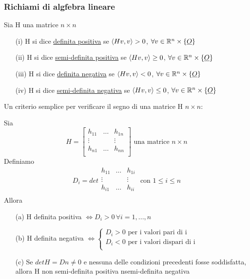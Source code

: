 \subsubsection{Richiami di algfebra lineare}
\begin{definition}
  Sia H una matrice $n\times n$
  \begin{enumerate}
    \item[(i)] H si dice \underline{definita positiva} se $\left\langle Hv,v \right\rangle > 0$, $\forall v \in \mathbb{R}^n \times \{\underline{O}\}$
    \item[(ii)] H si dice \underline{semi-definita positiva} se $\left\langle Hv,v \right\rangle \geq 0$, $\forall v \in \mathbb{R}^n \times \{\underline{O}\}$
    \item[(iii)] H si dice \underline{definita negativa} se $\left\langle Hv,v \right\rangle < 0$, $\forall v \in \mathbb{R}^n \times \{\underline{O}\}$
    \item[(iv)] H si dice \underline{semi-definita negativa} se $\left\langle Hv,v \right\rangle  \leq 0$, $\forall v \in \mathbb{R}^n \times \{\underline{O}\}$
  \end{enumerate}
\end{definition}
Un criterio semplice per verificare il segno di una matrice H $n\times n$:
\begin{theorem}
  Sia $$H = \begin{bmatrix}
    h_{11} & \dots & h_{1n} \\
    \vdots & & \vdots \\
    h_{n1} & \dots & h_{nn} \\
  \end{bmatrix} \text{ una matrice } n \times n$$
  Definiamo $$D_i = det\begin{matrix}
    h_{11} & \dots & h_{1i} \\
    \vdots & & \vdots \\
    h_{i1} & \dots & h_{ii} \\
  \end{matrix} \text{ con } 1 \leq i \leq n$$
  Allora 
  \begin{enumerate}
    \item[(a)] H \ace definita positiva $\iff D_i > 0 \, \forall i = 1, ..., n$
    \item[(b)] H \ace definita negativa $\iff \left\{\begin{array}{l}
      D_i > 0 \text{ per i valori pari di i} \\
      D_i < 0 \text{ per i valori dispari di i} \\
    \end{array}\right.$
    \item[(c)] Se $detH = Dn \neq 0$ e nessuna delle condizioni precedenti fosse soddisfatta, allora H non \ace semi-definita 
                positiva n\ace semi-definita negativa
  \end{enumerate}
\end{theorem}
